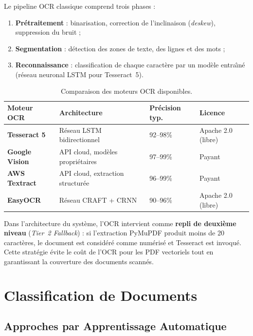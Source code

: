 Le pipeline OCR classique comprend trois phases :
\begin{enumerate}[leftmargin=*, itemsep=4pt]
    \item \textbf{Pr\'{e}traitement} : binarisation, correction de l'inclinaison (\textit{deskew}), suppression du bruit ;
    \item \textbf{Segmentation} : d\'{e}tection des zones de texte, des lignes et des mots ;
    \item \textbf{Reconnaissance} : classification de chaque caract\`{e}re par un mod\`{e}le entra\^{\i}n\'{e} (r\'{e}seau neuronal LSTM pour Tesseract~5).
\end{enumerate}

\begin{table}[H]
\centering
\small
\begin{tabularx}{\textwidth}{@{}>{\bfseries}p{3cm} Y Y Y@{}}
\toprule
{}
Moteur OCR & Architecture & Pr\'{e}cision typ. & Licence \\
\midrule
Tesseract 5 & R\'{e}seau LSTM bidirectionnel & 92--98\% & Apache 2.0 (libre) \\
Google Vision & API cloud, mod\`{e}les propri\'{e}taires & 97--99\% & Payant \\
AWS Textract & API cloud, extraction structur\'{e}e & 96--99\% & Payant \\
EasyOCR & R\'{e}seau CRAFT + CRNN & 90--96\% & Apache 2.0 (libre) \\
\bottomrule
\end{tabularx}
\caption{Comparaison des moteurs OCR disponibles.}
\label{tab:ocr-comparison}
\end{table}

Dans l'architecture du syst\`{e}me, l'OCR intervient comme \textbf{repli de deuxi\`{e}me niveau} (\textit{Tier~2 Fallback}) : si l'extraction PyMuPDF produit moins de 20 caract\`{e}res, le document est consid\'{e}r\'{e} comme num\'{e}ris\'{e} et Tesseract est invoqu\'{e}. Cette strat\'{e}gie \'{e}vite le co\^{u}t de l'OCR pour les PDF vectoriels tout en garantissant la couverture des documents scann\'{e}s.

\section{Classification de Documents}

\subsection{Approches par Apprentissage Automatique}

